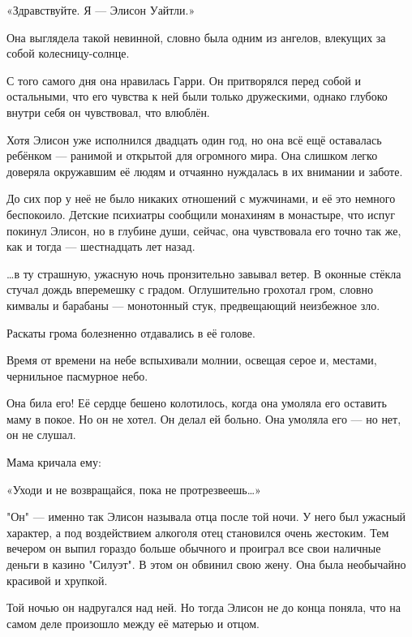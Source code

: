 \documentclass[a4paper,12pt]{book}
\begin{document}
\par
«Здравствуйте. Я — Элисон Уайтли.»\\
\par
Она выглядела такой невинной, словно была одним из ангелов, влекущих за собой колесницу-солнце.
\par
С того самого дня она нравилась Гарри. Он притворялся перед собой и остальными, что его чувства к ней были только дружескими, однако глубоко внутри себя он чувствовал, что влюблён.\\
\par
Хотя Элисон уже исполнился двадцать один год, но она всё ещё оставалась ребёнком — ранимой и открытой для огромного мира. Она слишком легко доверяла окружавшим её людям и отчаянно нуждалась в их внимании и заботе.
\par
До сих пор у неё не было никаких отношений с мужчинами, и её это немного беспокоило. Детские психиатры сообщили монахиням в монастыре, что испуг покинул Элисон, но в глубине души, сейчас, она чувствовала его точно так же, как и тогда — шестнадцать лет назад.\\
\par
…в ту страшную, ужасную ночь пронзительно завывал ветер. В оконные стёкла стучал дождь вперемешку с градом. Оглушительно грохотал гром, словно кимвалы и барабаны — монотонный стук, предвещающий неизбежное зло.\\
\par
Раскаты грома болезненно  отдавались в её голове.\\
\par
Время от времени на небе вспыхивали молнии, освещая серое и, местами, чернильное пасмурное небо.
\par
Она била его! Её сердце бешено колотилось, когда она умоляла его оставить маму в покое. Но он не хотел. Он делал ей больно. Она умоляла его — но нет, он не слушал.
\par
Мама кричала ему:
\par
«Уходи и не возвращайся, пока не протрезвеешь…»\\
\par
"Он" — именно так Элисон называла отца после той ночи. У него был ужасный характер, а под воздействием алкоголя отец становился очень жестоким. Тем вечером он выпил гораздо больше обычного и проиграл все свои наличные деньги в казино "Силуэт". В этом он обвинил свою жену. Она была необычайно красивой и хрупкой.
\par
Той ночью он надругался над ней. Но тогда Элисон не до конца поняла, что на самом деле произошло между её матерью и отцом.
\end{document}
